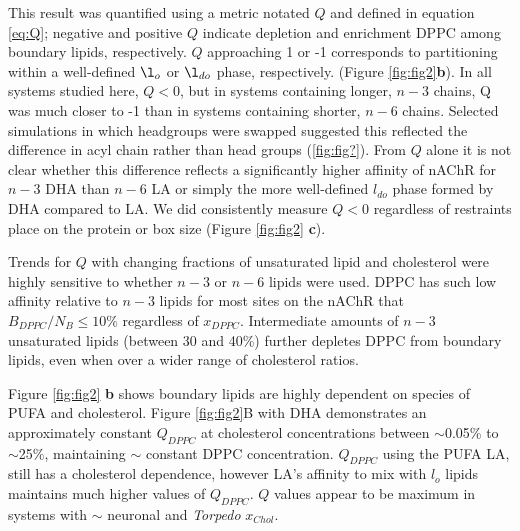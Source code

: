 	This result was quantified using a metric notated $Q$ and defined in equation \ref{eq:Q}; negative and positive $Q$ indicate depletion and enrichment DPPC among boundary lipids, respectively.  $Q$ approaching 1 or -1 corresponds to partitioning within a well-defined $\l_{o}$ or $\l_{do}$ phase, respectively. (Figure \ref{fig:fig2}\textbf{b}).%
	In all systems studied here, $Q < 0$, but in systems containing longer, $n-3$ chains, Q was much closer to -1 than in systems containing shorter, $n-6$ chains.  Selected simulations in which headgroups were swapped suggested this reflected the difference in acyl chain rather than head groups (\ref{fig:fig?}). From $Q$ alone it is not clear whether this difference reflects a significantly higher affinity of nAChR for $n-3$ DHA than $n-6$ LA or simply the more well-defined $l_{do}$ phase formed by DHA compared to LA. 	%
	We did consistently measure $Q<0$ regardless of restraints place on the protein or box size (Figure \ref{fig:fig2} \textbf{c}). %


	Trends for $Q$ with changing fractions of unsaturated lipid and cholesterol were highly sensitive to whether $n-3$ or $n-6$ lipids were used.  DPPC has such low affinity relative to $n-3$ lipids for most sites on the nAChR that $B_{DPPC}/N_{B} \le 10\%$ regardless of $x_{DPPC}$. Intermediate amounts of $n-3$ unsaturated lipids (between 30 and 40\%) further depletes DPPC from boundary lipids,  even when  over a wider range of cholesterol ratios.   
	
	Figure \ref{fig:fig2} \textbf{b} shows boundary lipids are highly dependent on species of PUFA and cholesterol. Figure \ref{fig:fig2}B with DHA demonstrates an approximately constant $Q_{DPPC}$ at cholesterol concentrations between $\sim$0.05\% to $\sim$25\%, maintaining $\sim$ constant DPPC concentration. $Q_{DPPC}$ using the PUFA LA, still has a cholesterol dependence, however LA's affinity to mix with $l_o$ lipids maintains much higher values of $Q_{DPPC}$. $Q$ values appear to be maximum in systems with $\sim$ neuronal and \textit{Torpedo} $x_{Chol}$.


